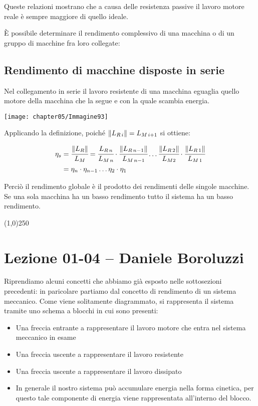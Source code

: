 	Queste relazioni mostrano che a causa delle resistenza passive il lavoro motore reale è sempre maggiore di quello ideale.
	
	È possibile determinare il rendimento complessivo di una macchina o di un gruppo di macchine fra loro collegate:
	
	\subsection{Rendimento di macchine disposte in serie}
	
	Nel collegamento in serie il lavoro resistente di una macchina eguaglia quello motore della macchina che la segue e con la quale scambia energia.
	\begin{center}
	\texttt{[image: chapter05/Immagine93]}
	\end{center}
	
	Applicando la definizione, poiché $\lVert L_{R\,i}\rVert = L_{M\,i+1}$ si ottiene:
	
	\begin{align*}
	\eta_s &= \cfrac{\lVert L_R\rVert}{L_M} = \cfrac{L_{R\,n}}{L_{M\,n}}\cdot\cfrac{\lVert L_{R\,n-1}\rVert}{L_{M\,n-1}}\dots\cfrac{\lVert L_{R\,2}\rVert}{L_{M2}}\cdot\cfrac{\lVert L_{R\,1}\rVert}{L_{M\,1}}\\
	&= \eta_n\cdot\eta_{n-1}\dots\eta_2\cdot\eta_1
	\end{align*}
	
	Perciò il rendimento globale è il prodotto dei rendimenti delle singole macchine. Se una sola macchina ha un basso rendimento tutto il sistema ha un basso rendimento.
	\begin{center}
\line(1,0){250}
\end{center}

\section{Lezione 01-04 -- Daniele Boroluzzi}

Riprendiamo alcuni concetti che abbiamo già esposto nelle sottosezioni precedenti: in paricolare partiamo dal concetto di rendimento di un sistema meccanico. Come viene solitamente diagrammato, si rappresenta il sistema tramite uno schema a blocchi in cui sono presenti:
\begin{itemize}
\item Una freccia entrante a rappresentare il lavoro motore che entra nel sistema meccanico in esame
\item Una freccia uscente a rappresentare il lavoro resistente
\item Una freccia uscente a rappresentare il lavoro dissipato
\item In generale il nostro sistema può accumulare energia nella forma cinetica, per questo tale componente di energia viene rappresentata all'interno del blocco.
\end{itemize}

